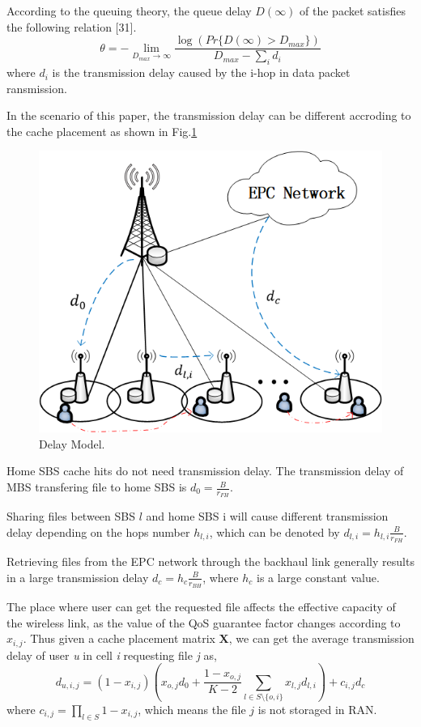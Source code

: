 \documentclass[conference]{IEEEtran}
\begin{document}
According to the queuing theory, the queue delay $D(\infty)$ of the packet satisfies the following relation [31].
\begin{equation}
\theta=-\lim_{D_{max}\to \infty}\frac{\log(Pr\{D(\infty)>D_{max}\})}{D_{max}-\sum_i d_i}
\end{equation}
where $d_i$ is the transmission delay caused by the i-hop in data packet ransmission.

In the scenario of this paper, the transmission delay can be different accroding to the cache placement as shown in Fig.\ref{fig 2}
\begin{figure}[htbp]
 \centerline{\includegraphics[scale=0.7]{fig2.png}}
 \caption{Delay Model.}
 \label{fig 2}
\end{figure}

Home SBS cache hits do not need transmission delay. The transmission delay of MBS transfering file to home SBS is $d_0=\frac{B}{r_{FH}}$.

 Sharing files between SBS $l$ and home SBS i will cause different transmission delay depending on the hops number $h_{l,i}$, which can be denoted by $d_{l,i}=h_{l,i}\frac{B}{r_{FH}}$.

Retrieving files from the EPC network through the backhaul link generally results in a large transmission delay $d_c=h_c\frac{B}{r_{BH}}$, where $h_c$ is a large constant value.

The place where user can get the requested file affects the effective capacity of the wireless link, as the value of the QoS guarantee factor changes according to $x_{i,j}$. Thus given a cache placement matrix $\mathbf{X}$, we can get the average transmission delay of user \emph{u} in cell \emph{i} requesting file \emph{j} as,
\begin{equation}
d_{u,i,j}=(1-x_{i,j})(x_{o,j}d_0+\frac{1-x_{o,j}}{K-2}\sum_{l\in S\setminus{\{o,i\}}}x_{l,j}d_{l,i})+c_{i,j}d_c
\end{equation}
where $c_{i,j}= \prod_{l\in S}1-x_{i,j}$, which means the file $j$ is not storaged in RAN.
\end{document}
